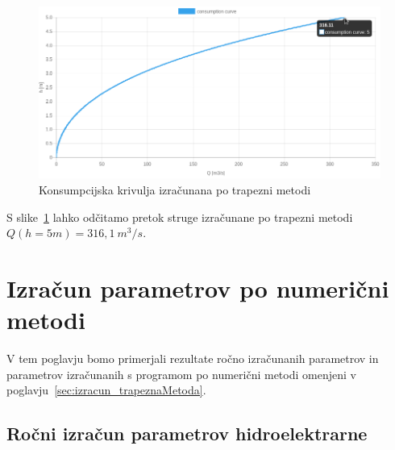 \begin{figure}[H]
	\begin{centering}
		\includegraphics[width=\textwidth]{slike/izracuni/trapeznaMetoda_konsumpcijska.png}		
		\caption{Konsumpcijska krivulja izračunana po trapezni metodi}\label{fig:trapeznaMetoda_konsumpcijskaKrivulja}
	\end{centering}
\end{figure}



S slike~\ref{fig:trapeznaMetoda_konsumpcijskaKrivulja} lahko odčitamo pretok struge izračunane po trapezni metodi $Q(h=5m) = 316,1~m^3/s$. 


\section{Izračun parametrov po numerični metodi}\label{sec:izracun_numericnaMetoda}

V tem poglavju bomo primerjali rezultate ročno izračunanih parametrov in parametrov izračunanih s programom po numerični metodi omenjeni v poglavju~\ref{sec:izracun_trapeznaMetoda}.


\subsection{Ročni izračun parametrov hidroelektrarne}\label{sec:izracun_rocno_numericnaMetoda}

